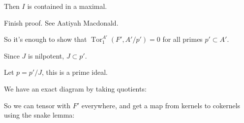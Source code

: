 Then \(I\) is contained in a maximal.

\begin{description}
\tightlist
\item[Exercise]
Finish proof. See Aatiyah Macdonald.
\end{description}

So it's enough to show that \(\operatorname{Tor}_1^{A'}(F', A'/p') = 0\)
for all primes \(p' \subset A'\).

\begin{description}
\tightlist
\item[Observation]
Since \(J\) is nilpotent, \(J \subset p'\).
\end{description}

Let \(p = p'/J\), this is a prime ideal.

We have an exact diagram by taking quotients:

\begin{center}
\end{center}

So we can tensor with \(F'\) everywhere, and get a map from kernels to
cokernels using the snake lemma:

